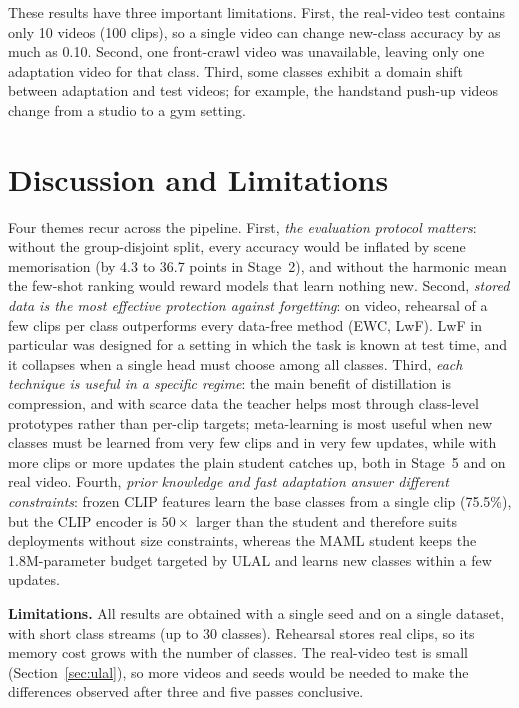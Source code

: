 \documentclass[conference]{IEEEtran}
\begin{document}
These results have three important limitations. First, the real-video test contains only
10 videos (100 clips), so a single video can change new-class accuracy by as much as 0.10.
Second, one front-crawl video was unavailable, leaving only one adaptation video for that
class. Third, some classes exhibit a domain shift between adaptation and test videos; for
example, the handstand push-up videos change from a studio to a gym setting.

\section{Discussion and Limitations}
Four themes recur across the pipeline. First, \emph{the evaluation protocol matters}: without the
group-disjoint split, every accuracy would be inflated by scene memorisation (by 4.3 to 36.7 points in
Stage~2), and without the harmonic mean the few-shot ranking would reward models that learn nothing new.
Second, \emph{stored data is the most effective protection against forgetting}: on video, rehearsal of a
few clips per class outperforms every data-free method (EWC, LwF). LwF in particular was designed for a
setting in which the task is known at test time, and it collapses when a single head must choose among all
classes. Third, \emph{each technique is useful in a specific regime}: the main benefit of distillation is
compression, and with scarce data the teacher helps most through class-level prototypes rather than
per-clip targets; meta-learning is most useful when new classes must be learned from very few clips and in
very few updates, while with more clips or more updates the plain student catches up, both in Stage~5 and on
real video. Fourth, \emph{prior knowledge and fast adaptation answer different constraints}: frozen CLIP
features learn the base classes from a single clip (75.5\%), but the CLIP encoder is $50\times$ larger than the
student and therefore suits deployments without size constraints, whereas the MAML student keeps the
1.8M-parameter budget targeted by ULAL and learns new classes within a few updates.

\textbf{Limitations.} All results are obtained with a single seed and on a single dataset, with short class
streams (up to 30 classes). Rehearsal stores real clips, so its memory cost grows with the number of
classes. The real-video test is small (Section~\ref{sec:ulal}), so more videos and seeds would be needed to
make the differences observed after three and five passes conclusive.
\end{document}
